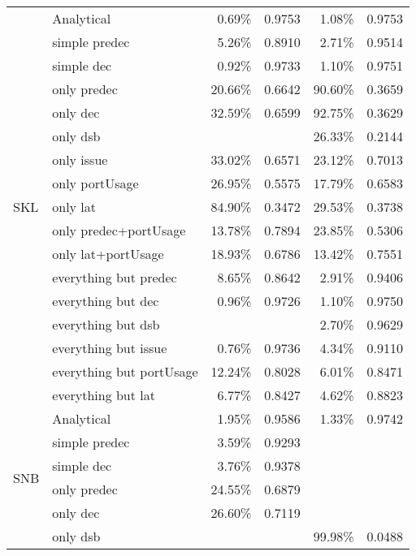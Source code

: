\documentclass[sigconf,nonacm]{acmart}
\begin{document}
\begin{table}
\begin{center}
\begin{tabular}{llrcrc}
\midrule
\multirow{17}{*}{SKL} & Analytical & 0.69\% & 0.9753 & 1.08\% & 0.9753\\
                      & simple predec  & 5.26\% & 0.8910 & 2.71\% & 0.9514\\
                      & simple dec  & 0.92\% & 0.9733 & 1.10\% & 0.9751\\
                      & only predec  & 20.66\% & 0.6642 & 90.60\% & 0.3659\\
                      & only dec  & 32.59\% & 0.6599 & 92.75\% & 0.3629\\
                      & only dsb  & & & 26.33\% & 0.2144\\
                      & only issue  & 33.02\% & 0.6571 & 23.12\% & 0.7013\\
                      & only portUsage  & 26.95\% & 0.5575 & 17.79\% & 0.6583\\
                      & only lat  & 84.90\% & 0.3472 & 29.53\% & 0.3738\\
                      & only predec+portUsage  & 13.78\% & 0.7894 & 23.85\% & 0.5306\\
                      & only lat+portUsage  & 18.93\% & 0.6786 & 13.42\% & 0.7551\\
                      & everything but predec  & 8.65\% & 0.8642 & 2.91\% & 0.9406\\
                      & everything but dec  & 0.96\% & 0.9726 & 1.10\% & 0.9750\\
                      & everything but dsb  & & & 2.70\% & 0.9629\\
                      & everything but issue  & 0.76\% & 0.9736 & 4.34\% & 0.9110\\
                      & everything but portUsage  & 12.24\% & 0.8028 & 6.01\% & 0.8471\\
                      & everything but lat  & 6.77\% & 0.8427 & 4.62\% & 0.8823\\
\midrule
\multirow{19}{*}{SNB} & Analytical & 1.95\% & 0.9586 & 1.33\% & 0.9742\\
                      & simple predec  & 3.59\% & 0.9293 & & \\
                      & simple dec  & 3.76\% & 0.9378 & & \\
                      & only predec  & 24.55\% & 0.6879 & & \\
                      & only dec  & 26.60\% & 0.7119 & & \\
                      & only dsb  & & & 99.98\% & 0.0488\\

\end{tabular}
\end{center}
\end{table}
\end{document}
